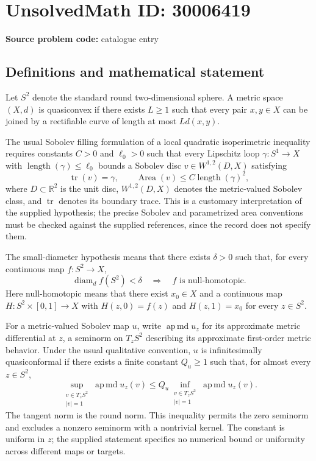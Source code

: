 \documentclass[11pt]{article}
\newcommand{\R}{\mathbb{R}}
\begin{document}
\section*{UnsolvedMath ID: 30006419}
\textbf{Source problem code:} catalogue entry
\subsection{Definitions and mathematical statement}
Let \(S^2\) denote the standard round two-dimensional sphere. A metric space \((X,d)\) is quasiconvex if there exists \(L\geq 1\) such that every pair \(x,y\in X\) can be joined by a rectifiable curve of length at most \(L d(x,y)\).

The usual Sobolev filling formulation of a local quadratic isoperimetric inequality requires constants \(C>0\) and \(\ell_0>0\) such that every Lipschitz loop \(\gamma:S^1\to X\) with \(\operatorname{length}(\gamma)\leq\ell_0\) bounds a Sobolev disc \(v\in W^{1,2}(D,X)\) satisfying
\[
\operatorname{tr}(v)=\gamma,
\qquad
\operatorname{Area}(v)\leq C\operatorname{length}(\gamma)^2,
\]
where \(D\subset\R^2\) is the unit disc, \(W^{1,2}(D,X)\) denotes the metric-valued Sobolev class, and \(\operatorname{tr}\) denotes its boundary trace. This is a customary interpretation of the supplied hypothesis; the precise Sobolev and parametrized area conventions must be checked against the supplied references, since the record does not specify them.

The small-diameter hypothesis means that there exists \(\delta>0\) such that, for every continuous map \(f:S^2\to X\),
\[
\operatorname{diam}_d f(S^2)<\delta
\quad\Longrightarrow\quad
f\text{ is null-homotopic}.
\]
Here null-homotopic means that there exist \(x_0\in X\) and a continuous map \(H:S^2\times[0,1]\to X\) with \(H(z,0)=f(z)\) and \(H(z,1)=x_0\) for every \(z\in S^2\).

For a metric-valued Sobolev map \(u\), write \(\operatorname{ap\,md}u_z\) for its approximate metric differential at \(z\), a seminorm on \(T_zS^2\) describing its approximate first-order metric behavior. Under the usual qualitative convention, \(u\) is infinitesimally quasiconformal if there exists a finite constant \(Q_u\geq1\) such that, for almost every \(z\in S^2\),
\[
\sup_{\substack{v\in T_zS^2\\ |v|=1}}
\operatorname{ap\,md}u_z(v)
\leq
Q_u\inf_{\substack{v\in T_zS^2\\ |v|=1}}
\operatorname{ap\,md}u_z(v).
\]
The tangent norm is the round norm. This inequality permits the zero seminorm and excludes a nonzero seminorm with a nontrivial kernel. The constant is uniform in \(z\); the supplied statement specifies no numerical bound or uniformity across different maps or targets.
\end{document}
